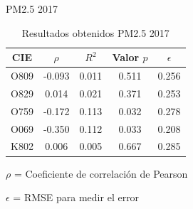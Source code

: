 \documentclass[11pt]{beamer}
\begin{document}
\begin{frame}{PM2.5 2017}
\begin{table}[hbt!]
\centering
\caption{Resultados obtenidos PM2.5 2017}
\label{tab:Resultados obtenidos PM2.5 2017}
\vspace{0.5cm}
\begin{tabular}{|c|c|c|c|c|}
	\hline
	CIE & $\rho$ & $R^2$ & Valor $p$ & $\epsilon$\\
	\hline
	O809 & -0.093 & 0.011 & 0.511 & 0.256 \\
	\hline
	O829 & 0.014 & 0.021 & 0.371 & 0.253 \\
	\hline
	O759 & -0.172 & 0.113 & 0.032 & 0.278 \\
	\hline
	O069 & -0.350 & 0.112 & 0.033 & 0.208 \\
	\hline
	K802 & 0.006 & 0.005 & 0.667 & 0.285 \\
	\hline
\end{tabular}
\footnotesize
\item{$\rho$ = Coeficiente de correlación de Pearson}
\item{$\epsilon$ = RMSE para medir el error}
\end{table}
\end{frame}
\end{document}
